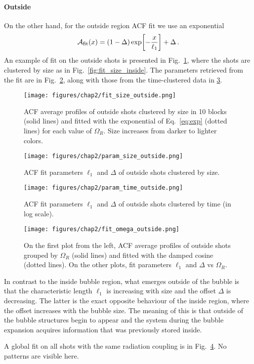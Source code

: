 \paragraph{Outside}
On the other hand, for the outside region ACF fit we use an exponential
\begin{equation}
    \mathcal{A}_{\rm fit}(x) = (1-\Delta)\exp[-\frac{x}{\ell_1}] + \Delta\, .
    \label{eq:exp}
\end{equation}
An example of fit on the outside shots is presented in Fig.\ \ref{fig:fit_size_outside}, where the shots are clustered by size as in Fig.\ \ref{fig:fit_size_inside}. The parameters retrieved from the fit are in Fig.\ \ref{fig:param_size_outside}, along with those from the time-clustered data in \ref{fig:param_time_outside}. 
\begin{figure}[ht!]
    \centering
    \texttt{[image: figures/chap2/fit\_size\_outside.png]}
    \caption{ACF average profiles of outside shots clustered by size in 10 blocks (solid lines) and fitted with the exponential of Eq.\ \eqref{eq:exp} (dotted lines) for each value of $\Omega_R$. Size increases from darker to lighter colors.}
    \label{fig:fit_size_outside}
\end{figure}
\begin{figure}[ht!]
    \centering
    \texttt{[image: figures/chap2/param\_size\_outside.png]}
    \caption{ACF fit parameters $\ell_1$ and $\Delta$ of outside shots clustered by size.}
    \label{fig:param_size_outside}
\end{figure}
\begin{figure}[ht!]
    \centering
    \texttt{[image: figures/chap2/param\_time\_outside.png]}
    \caption{ACF fit parameters $\ell_1$ and $\Delta$ of outside shots clustered by time (in log scale).}
    \label{fig:param_time_outside}
\end{figure}
\begin{figure}[ht!]
    \centering
    \texttt{[image: figures/chap2/fit\_omega\_outside.png]}
    \caption{On the first plot from the left, ACF average profiles of outside shots grouped by $\Omega_R$ (solid lines) and fitted with the damped cosine (dotted lines). On the other plots, fit parameters $\ell_1$ and $\Delta$ vs $\Omega_R$.}
    \label{fig:fit_omega_outside}
\end{figure}
In contrast to the inside bubble region, what emerges outside of the bubble is that the characteristic length $\ell_1$ is increasing with size and the offset $\Delta$ is decreasing. The latter is the exact opposite behaviour of the inside region, where the offset increases with the bubble size. The meaning of this is that outside of the bubble structures begin to appear and the system during the bubble expansion acquires information that was previously stored inside.

A global fit on all shots with the same radiation coupling is in Fig.\ \ref{fig:fit_omega_outside}. No patterns are visible here.

